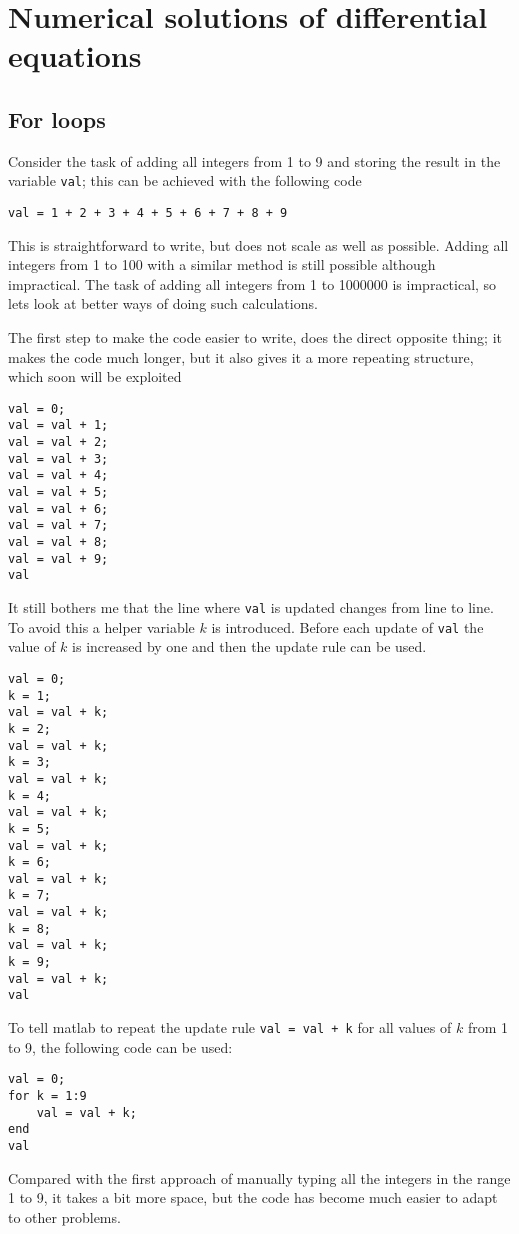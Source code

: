 \section{Numerical solutions of differential equations}

\subsection{For loops}

Consider the task of adding all integers from 1 to 9
and storing the result in the variable \verb!val!;  
this can be achieved with the following code 
\begin{lstlisting}
val = 1 + 2 + 3 + 4 + 5 + 6 + 7 + 8 + 9
\end{lstlisting}
This is straightforward to write, but does not scale
as well as possible.
Adding all integers from 1 to 100 with a similar method
is still possible although impractical.
The task of adding all integers from 1 to 1000000 
is impractical, so lets look at better ways of doing such 
calculations.

The first step to make the code easier to write, does the
direct opposite thing; it makes the code much longer, but it 
also gives it a more repeating structure, which soon will be 
exploited 
\begin{lstlisting}
val = 0;
val = val + 1;
val = val + 2;
val = val + 3;
val = val + 4;
val = val + 5;
val = val + 6;
val = val + 7;
val = val + 8;
val = val + 9;
val
\end{lstlisting}
It still bothers me that the line where \verb!val! is updated
changes from line to line.
To avoid this a helper variable $k$ is introduced.
Before each update of \verb!val! the value of $k$ is 
increased by one and then the update rule can be used.
\begin{lstlisting}
val = 0;
k = 1;
val = val + k;
k = 2;
val = val + k;
k = 3;
val = val + k;
k = 4;
val = val + k;
k = 5;
val = val + k;
k = 6;
val = val + k;
k = 7;
val = val + k;
k = 8;
val = val + k;
k = 9;
val = val + k;
val
\end{lstlisting}
To tell matlab to repeat the update rule \verb!val = val + k! for
all values of $k$ from 1 to 9, the following code can be used:
\begin{lstlisting}
val = 0;
for k = 1:9
    val = val + k;
end
val
\end{lstlisting}
Compared with the first approach of manually typing
all the integers in the range 1 to 9, it takes a bit more space, 
but the code has become much easier to adapt to other problems.


